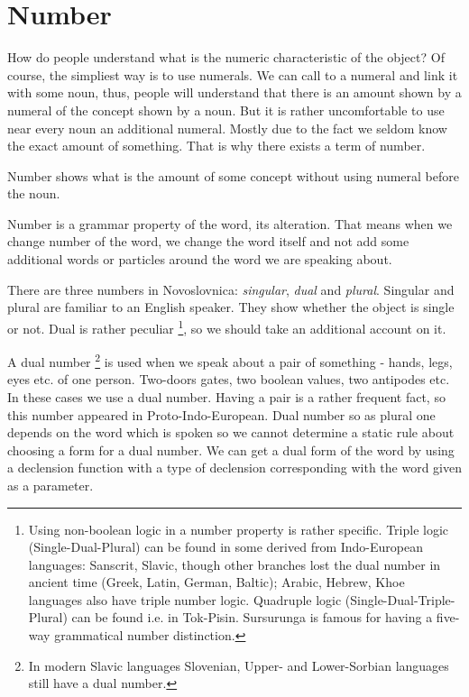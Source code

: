 \section{Number}

How do people understand what is the numeric characteristic of the object? Of course, the simpliest way is to use numerals. We can call to a numeral and link it with some noun, thus, people will understand that there is an amount shown by a numeral of the concept shown by a noun. But it is rather uncomfortable to use near every noun an additional numeral. Mostly due to the fact we seldom know the exact amount of something. That is why there exists a term of number.

Number shows what is the amount of some concept without using numeral before the noun.

Number is a grammar property of the word, its alteration. That means when we change number of the word, we change the word itself and not add some additional words or particles around the word we are speaking about.

There are three numbers in Novoslovnica: \textit{singular}, \textit{dual} and \textit{plural}. Singular and plural are familiar to an English speaker. They show whether the object is single or not. Dual is rather peculiar \footnote{Using non-boolean logic in a number property is rather specific. Triple logic (Single-Dual-Plural) can be found in some derived from Indo-European languages: Sanscrit, Slavic, though other branches lost the dual number in ancient time (Greek, Latin, German, Baltic); Arabic, Hebrew, Khoe languages also have triple number logic. Quadruple logic (Single-Dual-Triple-Plural) can be found i.e. in Tok-Pisin. Sursurunga is famous for having a five-way grammatical number distinction.}, so we should take an additional account on it.

A dual number \footnote{In modern Slavic languages Slovenian, Upper- and Lower-Sorbian languages still have a dual number.} is used when we speak about a pair of something - hands, legs, eyes etc. of one person. Two-doors gates, two boolean values, two antipodes etc. In these cases we use a dual number. Having a pair is a rather frequent fact, so this number appeared in Proto-Indo-European. Dual number so as plural one depends on the word which is spoken so we cannot determine a static rule about choosing a form for a dual number. We can get a dual form of the word by using a declension function with a type of declension corresponding with the word given as a parameter.

